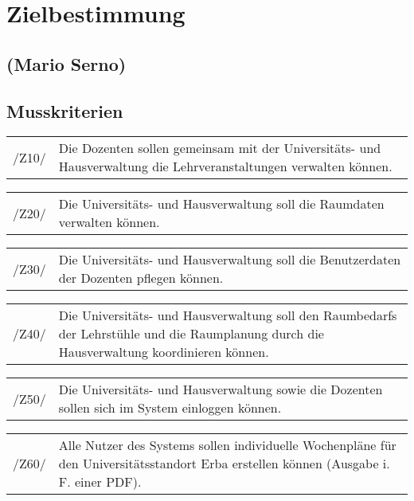 \section{Zielbestimmung}
\label{sec:Zielbestimmung}

\subsection*{(Mario Serno)}

\subsection{Musskriterien}

\begin{tabular}{p{1.5cm}p{14.5cm}}	
	 /Z10/& Die Dozenten sollen gemeinsam mit der Universitäts- und Hausverwaltung die Lehrveranstaltungen verwalten können. \\[0.25cm]
\end{tabular}

\begin{tabular}{p{1.5cm}p{14.5cm}}	
	 /Z20/& Die Universitäts- und Hausverwaltung soll die Raumdaten verwalten können. \\[0.25cm]
\end{tabular}

\begin{tabular}{p{1.5cm}p{14.5cm}}	
	 /Z30/& Die Universitäts- und Hausverwaltung soll die Benutzerdaten der Dozenten pflegen können. \\[0.25cm]
\end{tabular}

\begin{tabular}{p{1.5cm}p{14.5cm}}	
	 /Z40/& Die Universitäts- und Hausverwaltung soll den Raumbedarfs der Lehrstühle und die Raumplanung durch die Hausverwaltung koordinieren können.  \\[0.25cm]
\end{tabular}

\begin{tabular}{p{1.5cm}p{14.5cm}}	
	 /Z50/& Die Universitäts- und Hausverwaltung sowie die Dozenten sollen sich im System einloggen können. \\[0.25cm]
\end{tabular}

\begin{tabular}{p{1.5cm}p{14.5cm}}	
	 /Z60/& Alle Nutzer des Systems sollen individuelle Wochenpläne für den Universitätsstandort Erba erstellen können (Ausgabe i. F. einer PDF). \\[0.25cm]
\end{tabular}

